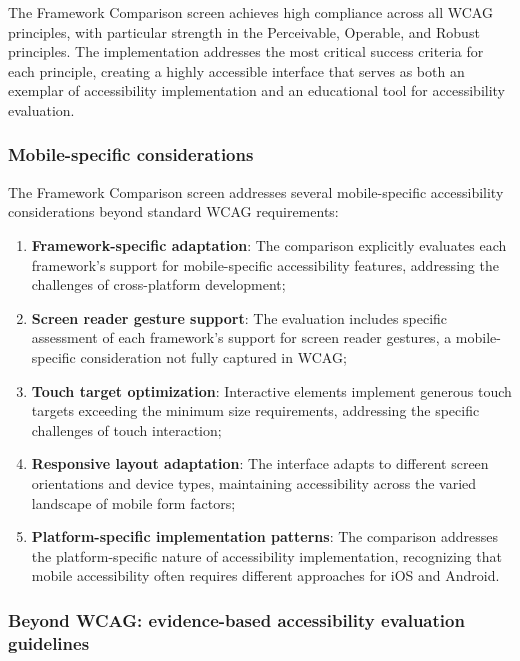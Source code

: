 The Framework Comparison screen achieves high compliance across all WCAG principles, with particular strength in the Perceivable, Operable, and Robust principles. The implementation addresses the most critical success criteria for each principle, creating a highly accessible interface that serves as both an exemplar of accessibility implementation and an educational tool for accessibility evaluation.

\subsubsection{Mobile-specific considerations}

The Framework Comparison screen addresses several mobile-specific accessibility considerations beyond standard WCAG requirements:

\begin{enumerate}
    \item \textbf{Framework-specific adaptation}: The comparison explicitly evaluates each framework's support for mobile-specific accessibility features, addressing the challenges of cross-platform development;
    
    \item \textbf{Screen reader gesture support}: The evaluation includes specific assessment of each framework's support for screen reader gestures, a mobile-specific consideration not fully captured in WCAG;
    
    \item \textbf{Touch target optimization}: Interactive elements implement generous touch targets exceeding the minimum size requirements, addressing the specific challenges of touch interaction;
    
    \item \textbf{Responsive layout adaptation}: The interface adapts to different screen orientations and device types, maintaining accessibility across the varied landscape of mobile form factors;
    
    \item \textbf{Platform-specific implementation patterns}: The comparison addresses the platform-specific nature of accessibility implementation, recognizing that mobile accessibility often requires different approaches for iOS and Android.
\end{enumerate}

\subsubsection{Beyond WCAG: evidence-based accessibility evaluation guidelines}

